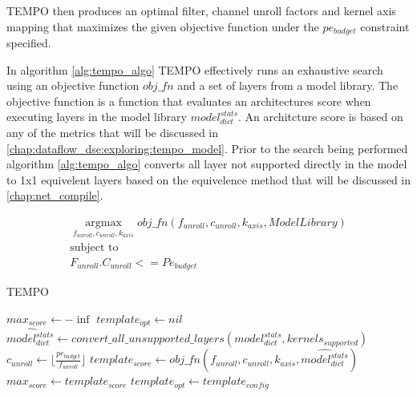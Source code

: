 TEMPO then produces an optimal filter, channel unroll factors and kernel axis
mapping that maximizes the given objective function under the $pe_{budget}$
constraint specified. 

In algorithm \ref{alg:tempo_algo} TEMPO effectively runs an exhaustive search
using an objective function $obj\_fn$ and a set of layers from a model library.
The objective function is a function that evaluates an architectures score when
executing layers in the model library $model^{stats}_{dict}$. An architcture
score is based on any of the metrics that will be discussed in
\autoref{chap:dataflow_dse:exploring:tempo_model}. Prior to the search being
performed algorithm \ref{alg:tempo_algo} converts all layer not supported
directly in the model to 1x1 equivelent layers based on the equivelence method
that will be discussed in \autoref{chap:net_compile}.

\begin{equation}
    \begin{aligned}
        \operatorname*{argmax}_{f_{unroll}, c_{unroll}, k_{axis}} obj\_fn(f_{unroll}, c_{unroll}, k_{axis}, ModelLibrary) \\
        \text{subject to} \\
        F_{unroll}. C_{unroll} <= Pe_{budget}
    \end{aligned}
    \label{math:tempo_algo_tldr}
\end{equation}

\begin{algorithm}[H] 
    \caption{\ac{TEMPO}}
    \label{alg:tempo_algo}
    \begin{algorithmic}[1]
    \Statex
        \State $max_{score} \gets -\inf$
        \State $template_{opt} \gets nil$
        \State $\hat{model^{stats}_{dict}} \gets convert\_all\_unsupported\_layers(model^{stats}_{dict}, kernels_{supported})$
                \State $c_{unroll} \gets \lfloor \frac{pe_{budget}}{f_{unroll}} \rfloor$ 
                \State $template_{score} \gets obj\_fn(f_{unroll}, c_{unroll}, k_{axis}, \hat{model^{stats}_{dict}})$
                    \State $max_{score} \gets template_{score}$
                    \State $template_{opt} \gets template_{config}$
                \EndIf
            \EndFor
        \EndFor
        \State {}
    \EndFunction
    \end{algorithmic}
\end{algorithm}

